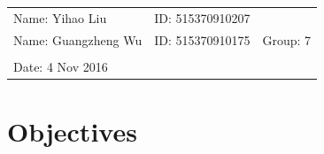 \documentclass{article}
\begin{document}
\vspace*{0.25cm}

\hrulefill

\thispagestyle{empty}

\begin{center}
\begin{large}
\end{large}

\hrulefill

\vspace*{5cm}
\begin{Large}
\end{Large}

\vspace{2em}

\begin{large}
\end{large}
\end{center}


\vfill

\begin{table}[h!]
\flushleft
\begin{tabular}{lll}
Name: Yihao Liu \hspace*{2em}&
ID: 515370910207\hspace*{2em}\\
Name: Guangzheng Wu \hspace*{2em}&
ID: 515370910175\hspace*{2em}& Group: 7\\


\\

Date: 4 Nov 2016 

\end{tabular}
\end{table}

\hfill
\begin{tiny}
[rev. 1.0]
\end{tiny}

\newpage

\tableofcontents

\newpage

\section{Objectives}
\end{document}
